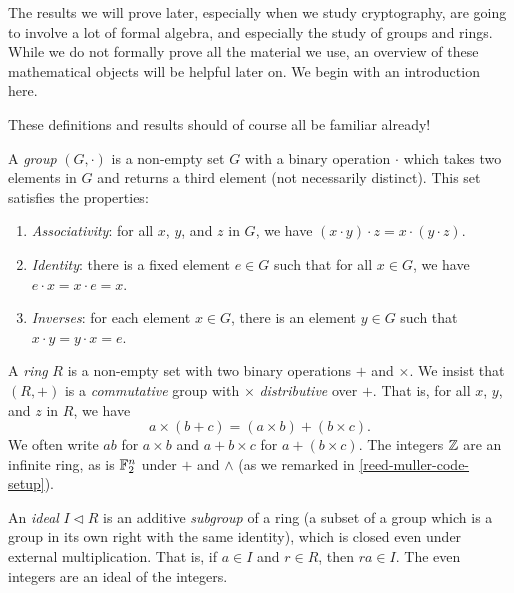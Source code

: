 \documentclass{article}
\begin{document}
The results we will prove later, especially when we study cryptography, are going to involve a lot of formal algebra, and especially the study of groups and rings. While we do not formally prove all the material we use, an overview of these mathematical objects will be helpful later on. We begin with an introduction here.

\begin{note}
	These definitions and results should of course all be familiar already!
\end{note}

\begin{definition}[Group]
    A \textit{group} $(G, \cdot)$ is a non-empty set $G$ with a binary operation $\cdot$ which takes two elements in $G$ and returns a third element (not necessarily distinct). This set satisfies the properties:
    \begin{enumerate}
	    \item \textit{Associativity}: for all $x$, $y$, and $z$ in $G$, we have $(x \cdot y) \cdot z = x \cdot (y \cdot z)$.
	    \item \textit{Identity}: there is a fixed element $e \in G$ such that for all $x \in G$, we have $e \cdot x = x \cdot e = x$.
	    \item \textit{Inverses}: for each element $x \in G$, there is an element $y \in G$ such that $x \cdot y = y \cdot x = e$.
	\end{enumerate}
\end{definition}

\begin{definition}[Ring]
    A \textit{ring} $R$ is a non-empty set with two binary operations $+$ and $\times$. We insist that $(R, +)$ is a \textit{commutative} group with $\times$ \textit{distributive} over $+$. That is, for all $x$, $y$, and $z$ in $R$, we have
    \[
	a \times (b + c) = (a \times b) + (b \times c).
	\]
	We often write $ab$ for $a \times b$ and $a + b \times c$ for $a + (b \times c)$. The integers $\mathbb{Z}$ are an infinite ring, as is $\mathbb{F}_2^n$ under $+$ and $\land$ (as we remarked in \ref{reed-muller-code-setup}).
\end{definition}

\begin{definition}[Ideal]
    An \textit{ideal} $I \triangleleft R$ is an additive \textit{subgroup} of a ring (a subset of a group which is a group in its own right with the same identity), which is closed even under external multiplication. That is, if $a \in I$ and $r \in R$, then $ra \in I$. The even integers are an ideal of the integers.
\end{definition}
\end{document}
